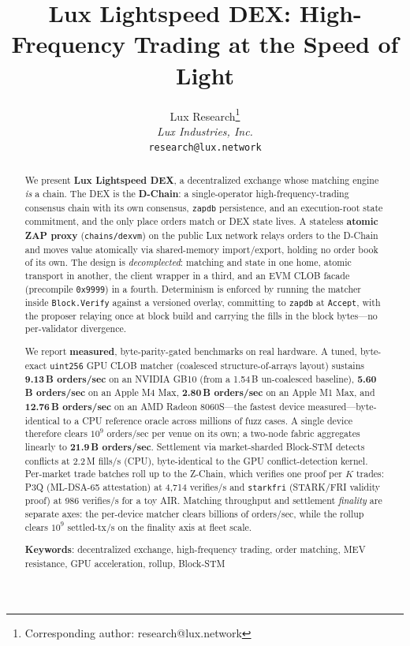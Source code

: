 \documentclass[11pt,letterpaper]{article}
\title{Lux Lightspeed DEX: High-Frequency Trading at the Speed of Light}
\author{
Lux Research\thanks{Corresponding author: research@lux.network}\\
\textit{Lux Industries, Inc.}\\
\texttt{research@lux.network}
}
\date{}
\begin{document}
\luxcoverpage

\begin{abstract}
We present \textbf{Lux Lightspeed DEX}, a decentralized exchange whose matching
engine \emph{is} a chain. The DEX is the \textbf{D-Chain}: a single-operator
high-frequency-trading consensus chain with its own consensus, \texttt{zapdb}
persistence, and an execution-root state commitment, and the only place orders
match or DEX state lives. A stateless \textbf{atomic ZAP proxy} (\texttt{chains/dexvm})
on the public Lux network relays orders to the D-Chain and moves value atomically
via shared-memory import/export, holding no order book of its own. The design is
\emph{decomplected}: matching and state in one home, atomic transport in another,
the client wrapper in a third, and an EVM CLOB facade (precompile \texttt{0x9999})
in a fourth. Determinism is enforced by running the matcher inside
\texttt{Block.Verify} against a versioned overlay, committing to \texttt{zapdb} at
\texttt{Accept}, with the proposer relaying once at block build and carrying the
fills in the block bytes---no per-validator divergence.

We report \textbf{measured}, byte-parity-gated benchmarks on real hardware. A tuned,
byte-exact \texttt{uint256} GPU CLOB matcher (coalesced structure-of-arrays layout)
sustains \textbf{9.13\,B orders/sec} on an NVIDIA GB10 (from a 1.54\,B un-coalesced
baseline), \textbf{5.60\,B orders/sec} on an Apple M4 Max, \textbf{2.80\,B orders/sec}
on an Apple M1 Max, and \textbf{12.76\,B orders/sec} on an AMD Radeon 8060S---the
fastest device measured---byte-identical to a CPU reference oracle across millions of
fuzz cases. A single device therefore clears $10^{9}$ orders/sec per venue on its own;
a two-node fabric aggregates linearly to \textbf{21.9\,B orders/sec}. Settlement via
market-sharded Block-STM detects conflicts at 2.2\,M fills/s (CPU), byte-identical to
the GPU conflict-detection kernel. Per-market trade batches roll up to the Z-Chain,
which verifies one proof per $K$ trades: P3Q (ML-DSA-65 attestation) at 4{,}714
verifies/s and \texttt{starkfri} (STARK/FRI validity proof) at 986 verifies/s for a
toy AIR. Matching throughput and settlement \emph{finality} are separate axes: the
per-device matcher clears billions of orders/sec, while the rollup clears $10^{9}$
settled-tx/s on the finality axis at fleet scale.

\textbf{Keywords}: decentralized exchange, high-frequency trading, order matching,
MEV resistance, GPU acceleration, rollup, Block-STM
\end{abstract}

















\end{document}
